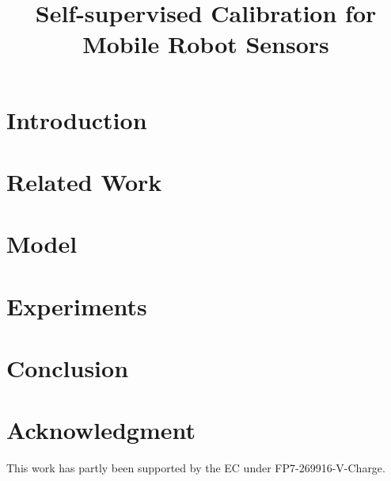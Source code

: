 \documentclass[letterpaper, 10 pt, conference]{sty/ieeeconf}
\begin{document}
\title{\LARGE \bf
Self-supervised Calibration for Mobile Robot Sensors
}

\author{
}

\maketitle

\begin{abstract}

\end{abstract}

\section{Introduction\label{intro}}


\section{Related Work\label{sec:rel}}


\section{Model\label{sec:model}}


\section{Experiments\label{sec:exp}}


\section{Conclusion\label{sec:conc}}


\section*{Acknowledgment}
This work has partly been supported by the EC under FP7-269916-V-Charge.



\end{document}
